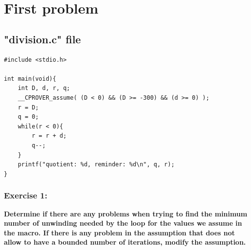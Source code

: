 \documentclass[a4paper,12pt]{article}
\begin{document}
	\begin{titlepage}
		\maketitle
		\thispagestyle{empty}
	\end{titlepage}
	\cleardoublepage
	\newpage

\tableofcontents
\listoffigures
\thispagestyle{empty}

\newpage

\section{First problem}
\subsection{"division.c" file}

\begin{lstlisting}
#include <stdio.h>

int main(void){
    int D, d, r, q;
    __CPROVER_assume( (D < 0) && (D >= -300) && (d >= 0) );
    r = D;
    q = 0;
    while(r < 0){
        r = r + d;
        q--;
    }
    printf("quotient: %d, reminder: %d\n", q, r);
}
\end{lstlisting}

\subsubsection{Exercise 1:}
\textbf{Determine if there are any problems when trying to find the minimum number of unwinding needed by the loop for the values we assume in the macro. If there is any problem in the assumption that does not allow to have a bounded number of iterations, modify the assumption.\\}
\end{document}
